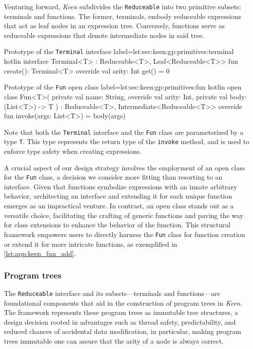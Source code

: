     Venturing forward, \textit{Keen} subdivides the \texttt{Reduceable} into 
    two primitive subsets: terminals and functions. The former, terminals, 
    embody reduceable expressions that act as leaf nodes in an expression tree. 
    Conversely, functions serve as reduceable expressions that denote 
    intermediate nodes in said tree.

    \begin{code}{Prototype of the \texttt{Terminal} interface}{
      label=lst:sec:keen:gp:primitives:terminal
    }{kotlin}
      interface Terminal<T> : Reduceable<T>, Leaf<Reduceable<T>> {
          fun create(): Terminal<T>
          override val arity: Int
              get() = 0
      }
    \end{code}

    \begin{code}{Prototype of the \texttt{Fun} open class}{
      label=lst:sec:keen:gp:primitives:fun
    }{kotlin}
      open class Fun<T>(
          private val name: String,
          override val arity: Int,
          private val body: (List<T>) -> T
      ) : Reduceable<T>, Intermediate<Reduceable<T>> {
          override fun invoke(args: List<T>) = body(args)
      }
    \end{code}

    Note that both the \texttt{Terminal} interface and the \texttt{Fun} class
    are parameterized by a type \texttt{T}. This type represents the return
    type of the \texttt{invoke} method, and is used to enforce type safety
    when creating expressions.

    A crucial aspect of our design strategy involves the employment of an open 
    class for the \texttt{Fun} class, a decision we consider more fitting than 
    resorting to an interface. Given that functions symbolize expressions with 
    an innate arbitrary behavior, architecting an interface and extending it 
    for each unique function emerges as an impractical venture. In contrast, an 
    open class stands out as a versatile choice, facilitating the crafting of 
    generic functions and paving the way for class extensions to enhance the 
    behavior of the function. This structural framework empowers users to 
    directly harness the \texttt{Fun} class for function creation or extend it 
    for more intricate functions, as exemplified in \vref{lst:app:keen_fun_add}.

  \subsubsection{Program trees}
    The \texttt{Reduceable} interface and its subsets—terminals and 
    functions—are foundational components that aid in the construction of 
    program trees in \textit{Keen}. The framework represents these program 
    trees as immutable tree structures, a design decision rooted in advantages 
    such as thread safety, predictability, and reduced chances of accidental 
    data modification, in particular, making program trees immutable one can 
    assure that the arity of a node is always correct.

